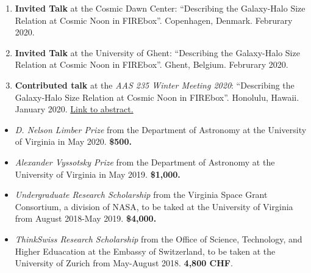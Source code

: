\documentclass[a4paper,10pt,oneside]{article}
\begin{document}
\begin{enumerate}[wide, labelwidth=!, labelindent=-11pt, parsep=0pt]
    \item {\bf Invited Talk} at the Cosmic Dawn Center: ``Describing the Galaxy-Halo Size Relation at Cosmic Noon in FIREbox''. Copenhagen, Denmark. Februrary 2020. 
    \item {\bf Invited Talk} at the University of Ghent: ``Describing the Galaxy-Halo Size Relation at Cosmic Noon in FIREbox''. Ghent, Belgium. Februrary 2020. 
    \item {\bf Contributed talk} at the {\it AAS 235 Winter Meeting 2020}: ``Describing the Galaxy-Halo Size Relation at Cosmic Noon in FIREbox''. Honolulu, Hawaii. January 2020. \href{https://ui.adsabs.harvard.edu/abs/2020AAS...23526001R/abstract}{Link to abstract.}
\end{enumerate}


\noindent{}

\begin{itemize}[wide, labelwidth=!, labelindent=-11pt, parsep=0pt]
    \item {\it D. Nelson Limber Prize} from the Department of Astronomy at the University of Virginia in May 2020. {\bf \$500.}
    \item {\it Alexander Vyssotsky Prize} from the Department of Astronomy at the University of Virginia in May 2019. {\bf \$1,000.}
    \item {\it Undergraduate Research Scholarship} from the Virginia Space Grant Consortium, a division of NASA, to be taked at the University of Virginia from August 2018-May 2019. {\bf \$4,000.} 
    \item {\it ThinkSwiss Research Scholarship} from the Office of Science, Technology, and Higher Eduacation at the Embassy of Switzerland, to be taken at the University of Zurich from May-August 2018. {\bf 4,800 CHF}.
\end{itemize}
\end{document}
